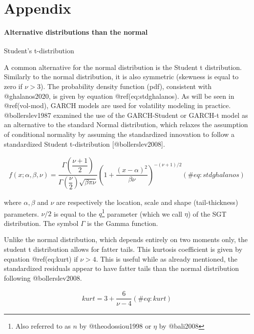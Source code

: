 \documentclass[
]{article}
\author{}
\date{\vspace{-2.5em}}
\begin{document}
\startappendices

\hypertarget{appendix}{%
\section{Appendix}\label{appendix}}

\hypertarget{conditional-distributions}{%
\paragraph{Alternative distributions than the
normal}\label{conditional-distributions}}

Student's t-distribution

\noindent A common alternative for the normal distribution is the
Student t distribution. Similarly to the normal distribution, it is also
symmetric (skewness is equal to zero if \(\nu > 3\)). The probability
density function (pdf), consistent with @ghalanos2020, is given by
equation @ref(eq:stdghalanos). As will be seen in @ref(vol-mod), GARCH
models are used for volatility modeling in practice. @bollerslev1987
examined the use of the GARCH-Student or GARCH-t model as an alternative
to the standard Normal distribution, which relaxes the assumption of
conditional normality by assuming the standardized innovation to follow
a standardized Student t-distribution {[}@bollerslev2008{]}.

\begin{align}
f(x; \alpha, \beta,\nu) = \dfrac{\Gamma(\dfrac{\nu+1}{2})}{\Gamma(\dfrac{\nu}{2})\sqrt{\beta \pi \nu}} \left(1+\dfrac{(x-\alpha)^2}{\beta \nu}\right)^{-(\nu+1)/2}
 (\#eq:stdghalanos)
\end{align}

\noindent where \(\alpha, \beta\) and \(\nu\) are respectively the
location, scale and shape (tail-thickness) parameters. \(\nu/2\) is
equal to the \(q\)\footnote{Also referred to as \(n\) by
  @theodossiou1998 or \(\eta\) by @bali2008} parameter (which we call
\(\eta\)) of the SGT distribution. The symbol \(\Gamma\) is the Gamma
function.

\noindent Unlike the normal distribution, which depends entirely on two
moments only, the student t distribution allows for fatter tails. This
kurtosis coefficient is given by equation @ref(eq:kurt) if \(\nu>4\).
This is useful while as already mentioned, the standardized residuals
appear to have fatter tails than the normal distribution following
@bollerslev2008.

\begin{align}
kurt = 3 + \dfrac{6}{\nu-4}
 (\#eq:kurt)
\end{align}
\end{document}
